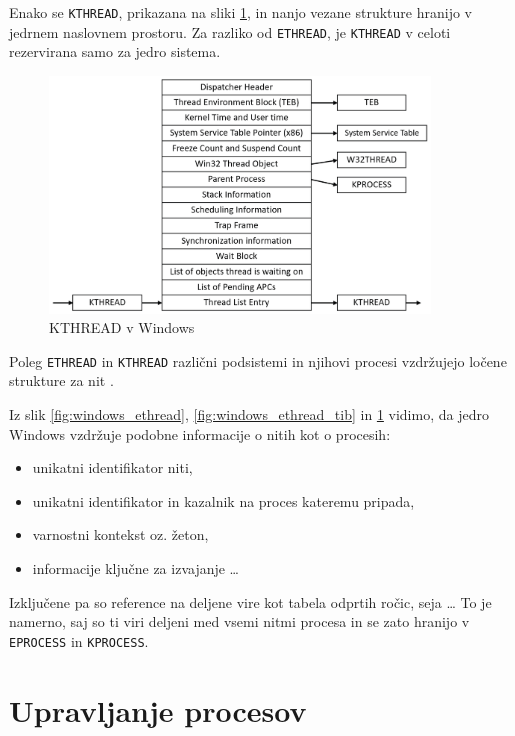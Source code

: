 \documentclass[a4paper,12pt,openright]{book}
\begin{document}
Enako se \texttt{KTHREAD}, prikazana na sliki \ref{fig:windows_kthread}, in nanjo vezane strukture hranijo v jedrnem naslovnem prostoru.
Za razliko od \texttt{ETHREAD}, je \texttt{KTHREAD} v celoti rezervirana samo za jedro sistema.

\begin{figure}[h!]
	\begin{center}
		\includegraphics[width=0.9\textwidth]{images/windows_kthread.png}
	\end{center}
	\caption{KTHREAD v Windows \cite{Yosifovich_Russinovich_Solomon_Ionescu_2017}}
	\label{fig:windows_kthread}
\end{figure}

Poleg \texttt{ETHREAD} in \texttt{KTHREAD} različni podsistemi in njihovi procesi vzdržujejo ločene strukture za nit \cite{Yosifovich_Russinovich_Solomon_Ionescu_2017}.

Iz slik \ref{fig:windows_ethread}, \ref{fig:windows_ethread_tib} in \ref{fig:windows_kthread} vidimo, da jedro Windows vzdržuje podobne informacije o nitih kot o procesih:
\begin{itemize}
	\item unikatni identifikator niti,
	\item unikatni identifikator in kazalnik na proces kateremu pripada,
	\item varnostni kontekst oz. žeton,
	\item informacije ključne za izvajanje \dots
\end{itemize}
Izključene pa so reference na deljene vire kot tabela odprtih ročic, seja \dots
To je namerno, saj so ti viri deljeni med vsemi nitmi procesa in se zato hranijo v \texttt{EPROCESS} in \texttt{KPROCESS}.

\chapter{Upravljanje procesov}
\end{document}
